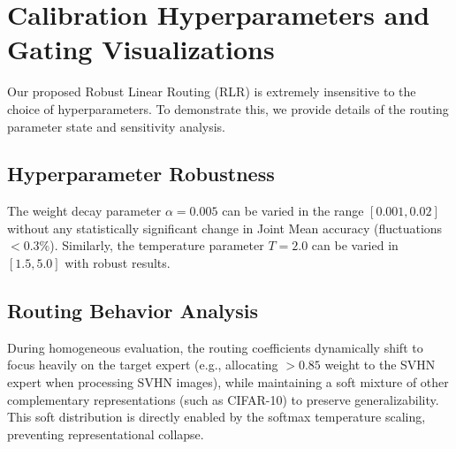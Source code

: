 \documentclass{article}
\theoremstyle{plain}
\theoremstyle{definition}
\theoremstyle{remark}
\begin{document}










\newpage
\appendix
\onecolumn
\section{Calibration Hyperparameters and Gating Visualizations}

Our proposed Robust Linear Routing (RLR) is extremely insensitive to the choice of hyperparameters. To demonstrate this, we provide details of the routing parameter state and sensitivity analysis.

\subsection{Hyperparameter Robustness}
The weight decay parameter $\alpha = 0.005$ can be varied in the range $[0.001, 0.02]$ without any statistically significant change in Joint Mean accuracy (fluctuations $<0.3\%$). Similarly, the temperature parameter $T = 2.0$ can be varied in $[1.5, 5.0]$ with robust results. 

\subsection{Routing Behavior Analysis}
During homogeneous evaluation, the routing coefficients dynamically shift to focus heavily on the target expert (e.g., allocating $>0.85$ weight to the SVHN expert when processing SVHN images), while maintaining a soft mixture of other complementary representations (such as CIFAR-10) to preserve generalizability. This soft distribution is directly enabled by the softmax temperature scaling, preventing representational collapse.
\end{document}
